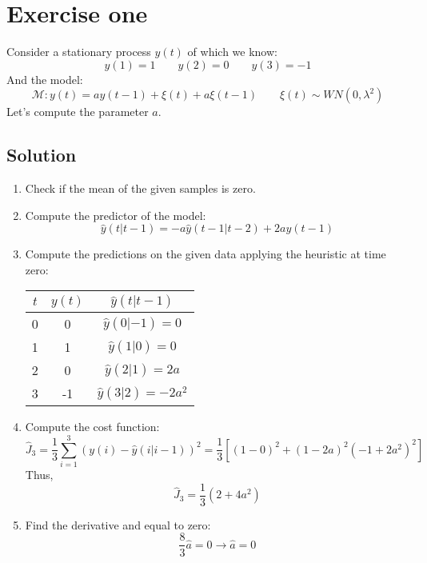 \section{Exercise one}

Consider a stationary process $y(t)$ of which we know: 
\[y(1)=1 \qquad y(2)=0 \qquad y(3)=-1\]
And the model: 
\[\mathcal{M}:y(t)=ay(t-1)+\xi(t)+a\xi(t-1)\qquad \xi(t)\sim WN(0,\lambda^2)\]
Let's compute the parameter $a$. 

\subsection*{Solution}
\begin{enumerate}
    \item Check if the mean of the given samples is zero.
    \item Compute the predictor of the model:
        \[\hat{y}(t|t-1)=-a\hat{y}(t-1|t-2)+2ay(t-1)\]
    \item Compute the predictions on the given data applying the heuristic at time zero:
        \begin{table}[H]
            \centering
            \begin{tabular}{ccc}
            \hline
            $t$ & $y(t)$ & $\hat{y}(t|t-1)$     \\ \hline
            0   & 0      & $\hat{y}(0|-1)=0$    \\
            1   & 1      & $\hat{y}(1|0)=0$     \\
            2   & 0      & $\hat{y}(2|1)=2a$    \\
            3   & -1     & $\hat{y}(3|2)=-2a^2$ \\ \hline
            \end{tabular}
        \end{table}
    \item Compute the cost function: 
        \[\hat{J}_3=\dfrac{1}{3}\sum_{i=1}^{3}{\left(y(i)-\hat{y}(i|i-1)\right)}^2=\dfrac{1}{3}\left[{\left(1-0\right)}^2+{\left(1-2a\right)}^2{\left(-1+2a^2\right)}^2\right]\]
        Thus, 
        \[\hat{J}_3=\dfrac{1}{3}\left(2+4a^2\right)\]
    \item Find the derivative and equal to zero: 
        \[\dfrac{8}{3}\hat{a}=0\rightarrow \hat{a}=0\]
\end{enumerate}